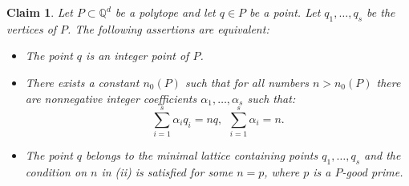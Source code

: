 \documentclass{daj}
\newcommand{\Q}{\mathbb Q}
\newtheorem{claim}[theorem]{Claim}
\theoremstyle{definition}
\theoremstyle{remark}
\theoremstyle{definition}
\theoremstyle{definition}
\begin{document}
\begin{claim}\label{crit}
Let $P \subset \Q^d$ be a polytope and let $q \in P$ be a point. Let $q_1, \ldots, q_s$ be the vertices of $P$. The following assertions are equivalent:
\begin{itemize}
    \item[(i)] The point $q$ is an integer point of $P$.
    \item[(ii)] There exists a constant $n_0(P)$ such that for all numbers $n > n_0(P)$ there are nonnegative integer coefficients $\alpha_1, \ldots, \alpha_s$ such that:
\begin{equation}\label{e}
    \sum_{i=1}^s \alpha_i q_i = n q, ~~ \sum_{i=1}^s \alpha_i = n.
\end{equation}
    \item[(iii)] The point $q$ belongs to the minimal lattice containing points $q_1, \ldots, q_s$ and the condition on $n$ in (ii) is satisfied for some $n = p$, where $p$ is a $P$-good prime.
\end{itemize}
\end{claim}
\end{document}
